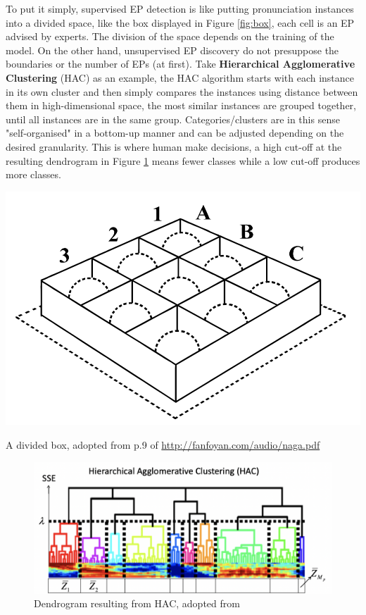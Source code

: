 \documentclass[nobib]{tufte-handout}
\begin{document}
To put it simply, supervised EP detection is like putting pronunciation instances into a divided space, like the box displayed in Figure \ref{fig:box}, each cell is an EP advised by experts. The division of the space depends on the training of the model. On the other hand, unsupervised EP discovery do not presuppose the boundaries or the number of EPs (at first). Take \textbf{Hierarchical Agglomerative Clustering} (HAC) as an example, the HAC algorithm starts with each instance in its own cluster and then simply compares the instances using distance between them in high-dimensional space, the most similar instances are grouped together, until all instances are in the same group. Categories/clusters are in this sense "self-organised" in a bottom-up manner and can be adjusted depending on the desired granularity. This is where human make decisions, a high cut-off at the resulting dendrogram in Figure \ref{fig:dendro} means fewer classes while a low cut-off produces more classes. 
\bigskip
\begin{marginfigure}
  \includegraphics{box.png}
  \caption{A divided box, adopted from p.9 of \url{http://fanfoyan.com/audio/naga.pdf}}
  \label{fig:box}
\end{marginfigure}
\vspace{5em}
\begin{figure}
  \includegraphics{dendro.png}
  \caption{Dendrogram resulting from HAC, adopted from \cite{wang2015supervised}}
  \label{fig:dendro}
\end{figure}
\end{document}
